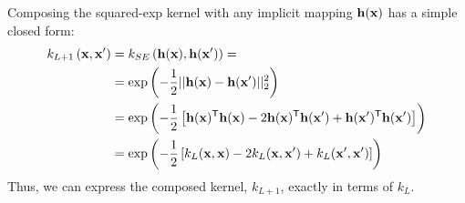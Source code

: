 Composing the squared-exp kernel with any implicit mapping ${\bf{h}}({\bf{x}})$ has a simple closed form:
%
\begin{align}
k_{L+1} \left( {\bf{x}}, {\bf{x}}' \right) & = k_{SE} \left( {\bf{h}}({\bf{x}}), {\bf{h}}({\bf{x}}') \right) =  \\
& = \exp \left( -\frac{1}{2} || {\bf{h}}({\bf{x}}) - {\bf{h}}({\bf{x}}')||_2^2 \right) \nonumber\\
& = \exp\left ( -\frac{1}{2} \left[ {\bf{h}}({\bf{x}}) ^{\mathsf{T}} {\bf{h}}({\bf{x}}) - 2 {\bf{h}}({\bf{x}}) ^{\mathsf{T}} {\bf{h}}({\bf{x}}') + {\bf{h}}({\bf{x}}') ^{\mathsf{T}} {\bf{h}}({\bf{x}}') \right] \right) \nonumber \\
& = \exp \left( -\frac{1}{2} \left[ k_{L}({\bf{x}}, {\bf{x}}) - 2 k_{L}({\bf{x}}, {\bf{x}}') + k_{L}({\bf{x}}', {\bf{x}}') \right] \right) \nonumber
\end{align}
%
%
%
Thus, we can express the composed kernel, $k_{L+1}$, exactly in terms of $k_L$.

